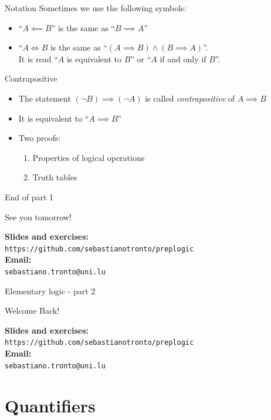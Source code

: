 \documentclass[11pt]{beamer}
\makeatletter
\theoremstyle{definition}
\newcommand{\refgithub}{
    \textbf{Slides and exercises:} \\
    \hspace{20pt}\texttt{https://github.com/sebastianotronto/preplogic} \\
    \textbf{Email:} \\
    \hspace{20pt}\texttt{sebastiano.tronto@uni.lu}
}
\makeatother
\begin{document}
\begin{frame}{Notation}
  Sometimes we use the following symbols:
  \begin{itemize}
    \item ``$A\impliedby B$'' is the same as ``$B\implies A$''
    \item ``$A\iff B$ is the same as ``$(A\implies B)\land (B\implies A)$''.\\
        It is read ``$A$ is equivalent to $B$'' or ``$A$ if and only if $B$''.
  \end{itemize}
\end{frame}

\begin{frame}{Contrapositive}
  \begin{itemize}
    \item The statement $(\neg B)\implies (\neg A)$ is called
          \emph{contrapositive} of $A\implies B$
    \pause
    \item It is equivalent to ``$A\implies B$''
    \pause
    \item Two proofs:
      \begin{enumerate}
        \item Properties of logical operations
        \item Truth tables
      \end{enumerate}
  \end{itemize}
\end{frame}

\begin{frame}{End of part 1}
  \begin{center}
    \Huge See you tomorrow!
  \end{center}
  \vspace{10pt}
  \refgithub
\end{frame}

\begin{frame}{Elementary logic - part 2}
  \begin{center}
    \Huge Welcome Back!
  \end{center}
  \vspace{10pt}
  \refgithub
\end{frame}


\section{Quantifiers}
\end{document}

